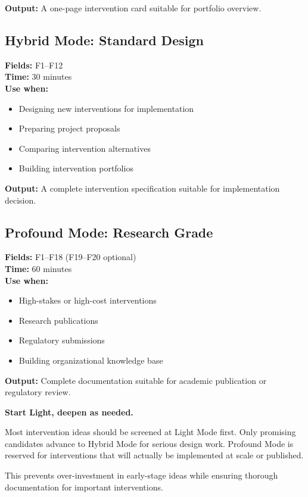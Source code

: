 \textbf{Output:} A one-page intervention card suitable for portfolio overview.

\subsection{Hybrid Mode: Standard Design}

\textbf{Fields:} F1--F12\\
\textbf{Time:} 30 minutes\\
\textbf{Use when:}
\begin{itemize}[nosep]
\item Designing new interventions for implementation
\item Preparing project proposals
\item Comparing intervention alternatives
\item Building intervention portfolios
\end{itemize}

\textbf{Output:} A complete intervention specification suitable for implementation decision.

\subsection{Profound Mode: Research Grade}

\textbf{Fields:} F1--F18 (F19--F20 optional)\\
\textbf{Time:} 60 minutes\\
\textbf{Use when:}
\begin{itemize}[nosep]
\item High-stakes or high-cost interventions
\item Research publications
\item Regulatory submissions
\item Building organizational knowledge base
\end{itemize}

\textbf{Output:} Complete documentation suitable for academic publication or regulatory review.

\begin{tcolorbox}[colback=blue!5!white, colframe=blue!75!black,
    title=Progression Principle]
\textbf{Start Light, deepen as needed.}

Most intervention ideas should be screened at Light Mode first. Only promising candidates advance to Hybrid Mode for serious design work. Profound Mode is reserved for interventions that will actually be implemented at scale or published.

This prevents over-investment in early-stage ideas while ensuring thorough documentation for important interventions.
\end{tcolorbox}


